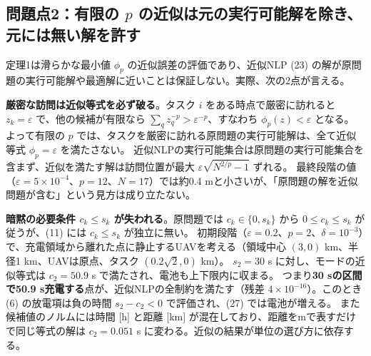 \documentclass[uplatex,dvipdfmx,a4paper,11pt,jafont=haranoaji]{bxjsarticle}
\newcommand{\answerpart}[1]{\par\Needspace{6\baselineskip}\subsection*{#1}}
\begin{document}
\answerpart{問題点2：有限の \texorpdfstring{$p$}{p} の近似は元の実行可能解を除き、元には無い解を許す}
定理1は滑らかな最小値 $\phi_p$ の近似誤差の評価であり、近似NLP (23) の解が原問題の実行可能解や最適解に近いことは保証しない。実際、次の2点が言える。

\textbf{厳密な訪問は近似等式を必ず破る}。タスク $i$ をある時点で厳密に訪れると $z_k=\varepsilon$ で、他の候補が有限なら
$\sum_qz_q^{-p}>\varepsilon^{-p}$、すなわち $\phi_p(z)<\varepsilon$ となる。
よって有限の $p$ では、タスクを厳密に訪れる原問題の実行可能解は、全て近似等式 $\phi_p=\varepsilon$ を満たさない。
近似NLPの実行可能集合は原問題の実行可能集合を含まず、近似を満たす解は訪問位置が最大 $\varepsilon\sqrt{N^{2/p}-1}$ ずれる。
最終段階の値（$\varepsilon=5\times10^{-4}$、$p=12$、$N=17$）では約0.4 mと小さいが、「原問題の解を近似問題が含む」という見方は成り立たない。

\textbf{暗黙の必要条件 $c_k\le s_k$ が失われる}。原問題では $c_k\in\{0,s_k\}$ から $0\le c_k\le s_k$ が従うが、(11) には $c_k\le s_k$ が独立に無い。
初期段階（$\varepsilon=0.2$、$p=2$、$\delta=10^{-3}$）で、充電領域から離れた点に静止するUAVを考える（領域中心 $(3,0)$ km、半径1 km、UAVは原点、タスク $(0.2\sqrt2,0)$ km）。
$s_2=30$ s に対し、モードの近似等式は $c_2=50.9$ s で満たされ、電池も上下限内に収まる。
つまり\textbf{30 sの区間で50.9 s充電する}点が、近似NLPの全制約を満たす（残差 $4\times10^{-16}$）。このとき (6) の放電項は負の時間 $s_2-c_2<0$ で評価され、(27) では電池が増える。
また候補値のノルムには時間 [h] と距離 [km] が混在しており、距離をmで表すだけで同じ等式の解は $c_2=0.051$ s に変わる。近似の結果が単位の選び方に依存する。
\end{document}
